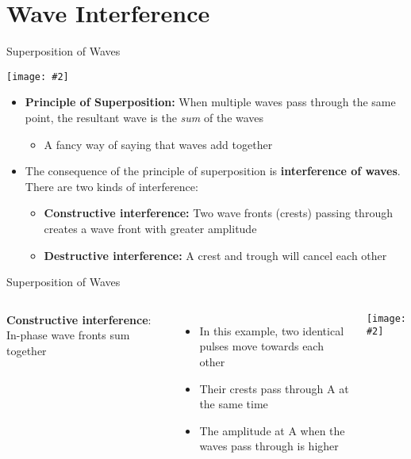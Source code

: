 \documentclass[12pt,aspectratio=169]{beamer}
\newcommand{\pic}[2]{\texttt{[image: \#2]}}
\begin{document}
\section[Interference]{Wave Interference}

\begin{frame}{Superposition of Waves}
  \begin{center}
    \pic{.6}{omkAt.png}
  \end{center}
  \begin{itemize}
  \item\textbf{Principle of Superposition:} When multiple waves pass through
    the same point, the resultant wave is the \emph{sum} of the waves
    \begin{itemize}
    \item A fancy way of saying that waves add together
    \end{itemize}
  \item The consequence of the principle of superposition is
    \textbf{interference of waves}. There are two kinds of interference:
    \begin{itemize}
    \item\textbf{Constructive interference:} Two wave fronts (crests) passing
      through creates a wave front with greater amplitude
    \item\textbf{Destructive interference:} A crest and trough will cancel
      each other
    \end{itemize}
  \end{itemize}
\end{frame}



\begin{frame}{Superposition of Waves}
  \begin{columns}
    \textbf{Constructive interference}: In-phase wave fronts sum together
    \begin{itemize}
    \item In this example, two identical pulses move towards each other
    \item Their crests pass through A at the same time
    \item The amplitude at A when the waves pass through is higher 
    \end{itemize}
    
    \pic{1}{constructive.png}
  \end{columns}
\end{frame}
\end{document}
